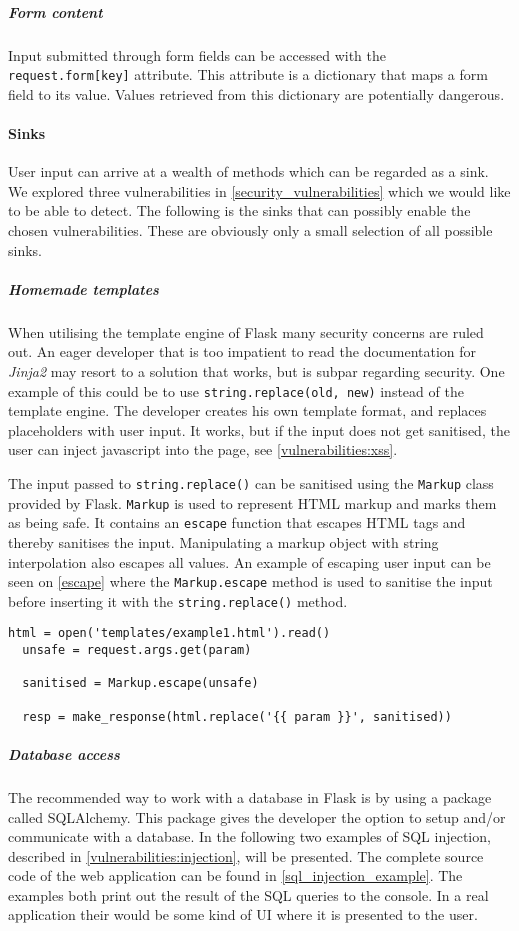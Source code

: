 \subparagraph{Form content}
Input submitted through form fields can be accessed with the \texttt{request.form[key]} attribute.
This attribute is a dictionary that maps a form field to its value.
Values retrieved from this dictionary are potentially dangerous.

\paragraph{Sinks}
User input can arrive at a wealth of methods which can be regarded as a sink.
We explored three vulnerabilities in \cref{security_vulnerabilities} which we would like to be able to detect.
The following is the sinks that can possibly enable the chosen vulnerabilities.
These are obviously only a small selection of all possible sinks.

\subparagraph{Homemade templates}
When utilising the template engine of Flask many security concerns are ruled out.
An eager developer that is too impatient to read the documentation for \emph{Jinja2} may resort to a solution that works, but is subpar regarding security.
One example of this could be to use \texttt{string.replace(old, new)} instead of the template engine.
The developer creates his own template format, and replaces placeholders with user input.
It works, but if the input does not get sanitised, the user can inject javascript into the page, see \cref{vulnerabilities:xss}.

The input passed to \texttt{string.replace()} can be sanitised using the \texttt{Markup} class provided by Flask.
\texttt{Markup} is used to represent HTML markup and marks them as being safe.
It contains an \texttt{escape} function that escapes HTML tags and thereby sanitises the input.
Manipulating a markup object with string interpolation also escapes all values.
An example of escaping user input can be seen on \cref{escape} where the \texttt{Markup.escape} method is used to sanitise the input before inserting it with the \texttt{string.replace()} method.

\begin{lstlisting}[style=python, caption={An example of escaping user input}, label={escape}]
  html = open('templates/example1.html').read()
  unsafe = request.args.get(param)

  sanitised = Markup.escape(unsafe)
  
  resp = make_response(html.replace('{{ param }}', sanitised))
\end{lstlisting}


\subparagraph{Database access}
The recommended way to work with a database in Flask is by using a package called SQLAlchemy\cite{sqlalchemy}.\cite{sqlalchemy_docs}
This package gives the developer the option to setup and/or communicate with a database.
In the following two examples of SQL injection, described in \cref{vulnerabilities:injection}, will be presented.
The complete source code of the web application can be found in \cref{sql_injection_example}.
The examples both print out the result of the SQL queries to the console.
In a real application their would be some kind of UI where it is presented to the user.


